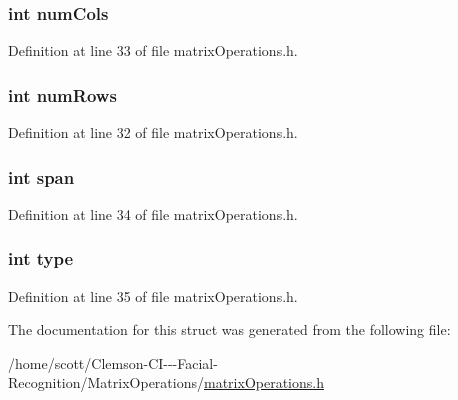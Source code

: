 \hypertarget{structmatrix__t_a2d4acb52d99b57b5b524aaa557ab91eb}{
\subsubsection[{num\-Cols}]{\setlength{\rightskip}{0pt plus 5cm}int num\-Cols}}\label{structmatrix__t_a2d4acb52d99b57b5b524aaa557ab91eb}


Definition at line 33 of file matrix\-Operations.\-h.

\hypertarget{structmatrix__t_a0801460eb7eb6812bd4e0ce52ab29024}{
\subsubsection[{num\-Rows}]{\setlength{\rightskip}{0pt plus 5cm}int num\-Rows}}\label{structmatrix__t_a0801460eb7eb6812bd4e0ce52ab29024}


Definition at line 32 of file matrix\-Operations.\-h.

\hypertarget{structmatrix__t_a63fc22149930803b4e3fb4c453177e5e}{
\subsubsection[{span}]{\setlength{\rightskip}{0pt plus 5cm}int span}}\label{structmatrix__t_a63fc22149930803b4e3fb4c453177e5e}


Definition at line 34 of file matrix\-Operations.\-h.

\hypertarget{structmatrix__t_ac765329451135abec74c45e1897abf26}{
\subsubsection[{type}]{\setlength{\rightskip}{0pt plus 5cm}int type}}\label{structmatrix__t_ac765329451135abec74c45e1897abf26}


Definition at line 35 of file matrix\-Operations.\-h.



The documentation for this struct was generated from the following file\-:\begin{DoxyCompactItemize}
\item 
/home/scott/\-Clemson-\/\-C\-I-\/-\/-\/\-Facial-\/\-Recognition/\-Matrix\-Operations/\hyperlink{matrix_operations_8h}{matrix\-Operations.\-h}\end{DoxyCompactItemize}
